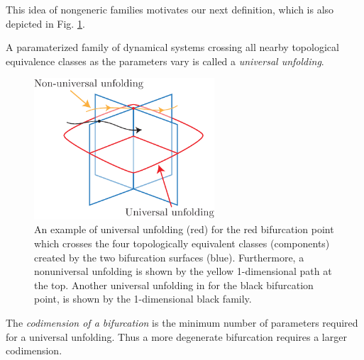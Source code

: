 This idea of nongeneric families motivates our next definition, which is also depicted in Fig. \ref{fig:univ_unfold_def}.
\begin{definition}
	A paramaterized family of dynamical systems crossing all nearby topological equivalence classes as the parameters vary is called a \emph{universal unfolding}.
\end{definition}
\begin{figure}[h!]
	\centering
	\includegraphics[width=0.6\textwidth]{figures/ch3/11univ_unfold_def.pdf}
	\caption{An example of universal unfolding (red) for the red bifurcation point which crosses the four topologically equivalent classes (components) created by the two bifurcation surfaces (blue). Furthermore, a nonuniversal unfolding is shown by the yellow 1-dimensional path at the top. Another universal unfolding in for the black bifurcation point, is shown by the 1-dimensional black family.}
	\label{fig:univ_unfold_def}
\end{figure}

\begin{definition} The \emph{codimension of a bifurcation} is the minimum number of parameters required for a universal unfolding. Thus a more degenerate bifurcation requires a larger codimension.
\end{definition}

